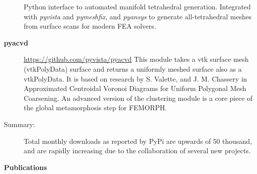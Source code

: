 \documentclass[letterpaper,11pt]{article}
\newcommand{\resheading}[1]{{\large \colorbox{mygrey}{\begin{minipage}{\textwidth}{\textbf{#1 \vphantom{p\^{E}}}}\end{minipage}}}}
\begin{document}
\begin{description}
Python interface to automated manifold tetrahedral generation.  Integrated with \textit{pyvista} and \textit{pymeshfix}, and \textit{pyansys} to generate all-tetrahedral meshes from surface scans for modern FEA solvers.
\item[\textbf{pyacvd}] \url{https://github.com/pyvista/pyacvd} \newline
  This module takes a vtk surface mesh (vtkPolyData) surface and returns a uniformly meshed surface also as a vtkPolyData.  It is based on research by S. Valette, and J. M. Chassery in Approximated Centroidal Voronoi Diagrams for Uniform Polygonal Mesh Coarsening.  An advanced version of the clustering module is a core piece of the global metamorphosis step for FEMORPH.

\item[Summary:] \newline
  Total monthly downloads as reported by PyPi are upwards of 50 thousand, and are rapidly increasing due to the collaboration of several new projects.
\end{description}


\resheading{Publications}
\end{document}
